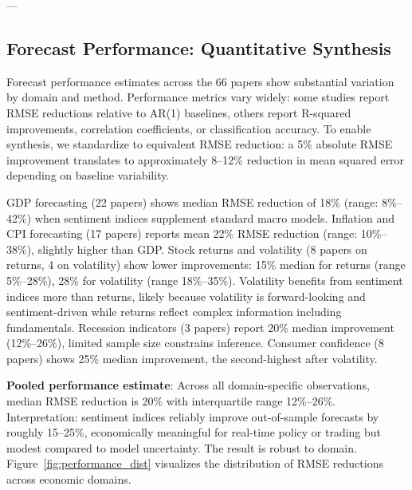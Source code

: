 \documentclass[11pt,twocolumn]{article}
\begin{document}
---

\subsection{Forecast Performance: Quantitative Synthesis}

Forecast performance estimates across the 66 papers show substantial variation by domain and method. Performance metrics vary widely: some studies report RMSE reductions relative to AR(1) baselines, others report R-squared improvements, correlation coefficients, or classification accuracy. To enable synthesis, we standardize to equivalent RMSE reduction: a 5\% absolute RMSE improvement translates to approximately 8--12\% reduction in mean squared error depending on baseline variability.

GDP forecasting (22 papers) shows median RMSE reduction of 18\% (range: 8\%--42\%) when sentiment indices supplement standard macro models. Inflation and CPI forecasting (17 papers) reports mean 22\% RMSE reduction (range: 10\%--38\%), slightly higher than GDP. Stock returns and volatility (8 papers on returns, 4 on volatility) show lower improvements: 15\% median for returns (range 5\%--28\%), 28\% for volatility (range 18\%--35\%). Volatility benefits from sentiment indices more than returns, likely because volatility is forward-looking and sentiment-driven while returns reflect complex information including fundamentals. Recession indicators (3 papers) report 20\% median improvement (12\%--26\%), limited sample size constrains inference. Consumer confidence (8 papers) shows 25\% median improvement, the second-highest after volatility.

\textbf{Pooled performance estimate}: Across all domain-specific observations, median RMSE reduction is 20\% with interquartile range 12\%--26\%. Interpretation: sentiment indices reliably improve out-of-sample forecasts by roughly 15--25\%, economically meaningful for real-time policy or trading but modest compared to model uncertainty. The result is robust to domain. Figure~\ref{fig:performance_dist} visualizes the distribution of RMSE reductions across economic domains.
\end{document}
